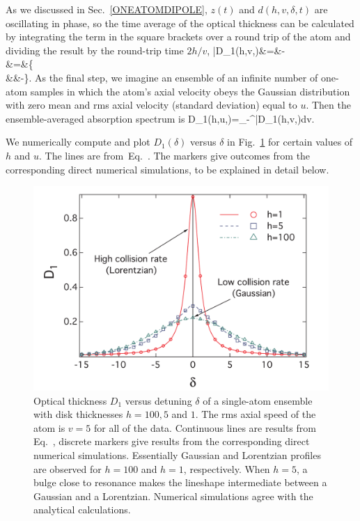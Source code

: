 As we discussed in Sec.~\ref{ONEATOMDIPOLE}, $z(t)$ and $d(h,v,\delta,t)$ are oscillating in phase, so the time average of the optical thickness can be calculated by integrating the term in the square brackets over a round trip of the atom and dividing the result by the round-trip time $2h/v$,
 \bea
\bar{D}_1(h,v,\delta)&=&-\nonumber\\
&=&\Bigg\{\nonumber\\
&&-\Bigg\}.
\label{THEORYD}
\eea
As the final step, we imagine an ensemble of an infinite number of one-atom samples in which the atom's axial velocity obeys the Gaussian distribution with zero mean and rms axial velocity (standard deviation) equal to $u$. Then the ensemble-averaged absorption spectrum is
\bea
D_1(h,u,\delta)=\int_{-\infty}^{\infty}\bar{D}_1(h,v,\delta)dv.
\label{ONEATOMSPECTRUM}
\eea

We numerically compute and plot $D_1(\delta)$ versus $\delta$ in  Fig.~\ref{SINGLESPECTRUM} for certain values of $h$ and $u$. The lines are from~Eq.~. The markers give outcomes from the corresponding direct numerical simulations, to be explained in detail below.
\begin{figure}[h!]
\begin{center}
\includegraphics[width=\textwidth]{single_atom.pdf}
\end{center}
\caption{Optical thickness $D_1$ versus detuning $\delta$ of a single-atom ensemble with disk thicknesses $h=100, 5$ and $1$. The rms axial speed of the atom is $v=5$ for all of the data. Continuous lines are results from Eq.~, discrete markers give results from the corresponding direct numerical simulations. Essentially Gaussian and Lorentzian profiles are observed for $h=100$ and $h=1$, respectively. When $h=5$, a bulge close to resonance makes the lineshape intermediate between a Gaussian and a Lorentzian. Numerical simulations agree with the analytical calculations.}
\label{SINGLESPECTRUM}
\end{figure}

